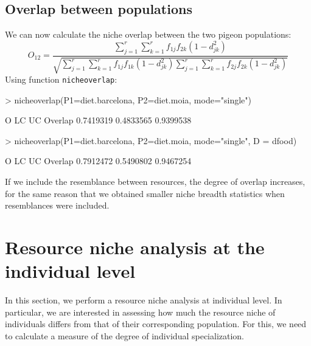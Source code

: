 \documentclass[11pt,a4paper]{article}
\begin{document}
\subsection{Overlap between populations}
We can now calculate the niche overlap between the two pigeon populations:
\[
O_{12} = \frac{\sum_{j=1}^r\sum_{k=1}^r{f_{1j}f_{2k}(1-d_{jk}^2)}}{\sqrt{\sum_{j=1}^r\sum_{k=1}^r{f_{1j}f_{1k}(1-d_{jk}^2)}\sum_{j=1}^r\sum_{k=1}^r{f_{2j}f_{2k}(1-d_{jk}^2)}}}
\]
Using function \texttt{nicheoverlap}:
\begin{Schunk}
\begin{Sinput}
> nicheoverlap(P1=diet.barcelona, P2=diet.moia, mode="single")
\end{Sinput}
\begin{Soutput}
                O        LC        UC
Overlap 0.7419319 0.4833565 0.9399538
\end{Soutput}
\begin{Sinput}
> nicheoverlap(P1=diet.barcelona, P2=diet.moia, mode="single", D = dfood)
\end{Sinput}
\begin{Soutput}
                O        LC        UC
Overlap 0.7912472 0.5490802 0.9467254
\end{Soutput}
\end{Schunk}
If we include the resemblance between resources, the degree of overlap increases, for the same reason that we obtained smaller niche breadth statistics when resemblances were included.

\section{Resource niche analysis at the individual level}
In this section, we perform a resource niche analysis at individual level. In particular, we are interested in assessing how much the resource niche of individuals differs from that of their corresponding population. For this, we need to calculate a measure of the degree of individual specialization. 
\end{document}
